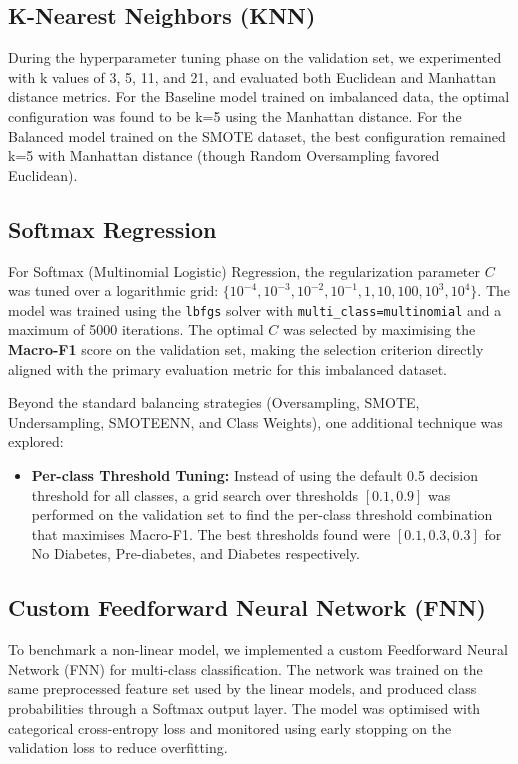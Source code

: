 \documentclass[12pt, a4paper]{article}
\begin{document}
\subsection{K-Nearest Neighbors (KNN)}
During the hyperparameter tuning phase on the validation set, we experimented with k values of 3, 5, 11, and 21, and evaluated both Euclidean and Manhattan distance metrics. For the Baseline model trained on imbalanced data, the optimal configuration was found to be k=5 using the Manhattan distance. For the Balanced model trained on the SMOTE dataset, the best configuration remained k=5 with Manhattan distance (though Random Oversampling favored Euclidean).

\subsection{Softmax Regression}
For Softmax (Multinomial Logistic) Regression, the regularization parameter $C$ was tuned over a logarithmic grid: $\{10^{-4}, 10^{-3}, 10^{-2}, 10^{-1}, 1, 10, 100, 10^{3}, 10^{4}\}$. The model was trained using the \texttt{lbfgs} solver with \texttt{multi\_class=multinomial} and a maximum of 5000 iterations. The optimal $C$ was selected by maximising the \textbf{Macro-F1} score on the validation set, making the selection criterion directly aligned with the primary evaluation metric for this imbalanced dataset.

Beyond the standard balancing strategies (Oversampling, SMOTE, Undersampling, SMOTEENN, and Class Weights), one additional technique was explored:
\begin{itemize}
    \item \textbf{Per-class Threshold Tuning:} Instead of using the default 0.5 decision threshold for all classes, a grid search over thresholds $[0.1, 0.9]$ was performed on the validation set to find the per-class threshold combination that maximises Macro-F1. The best thresholds found were $[0.1, 0.3, 0.3]$ for No Diabetes, Pre-diabetes, and Diabetes respectively.
\end{itemize}

\subsection{Custom Feedforward Neural Network (FNN)}
To benchmark a non-linear model, we implemented a custom Feedforward Neural Network (FNN) for multi-class classification. The network was trained on the same preprocessed feature set used by the linear models, and produced class probabilities through a Softmax output layer. The model was optimised with categorical cross-entropy loss and monitored using early stopping on the validation loss to reduce overfitting.
\end{document}
